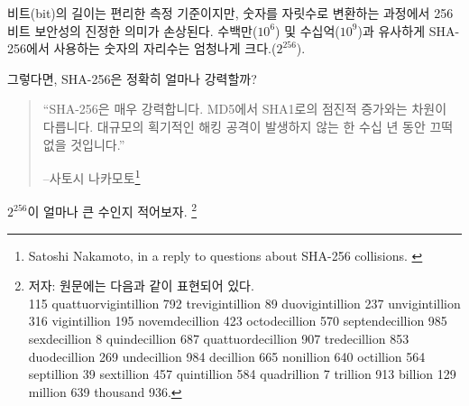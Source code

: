 \begin{comment}
	While bit length is a convenient metric, the true meaning of 256-bit
	security is lost in translation. Similar to the millions ($10^6$) and
	billions ($10^9$) above, the number in SHA-256 is about orders of magnitude
	($2^{256}$).
\end{comment}
비트(bit)의 길이는 편리한 측정 기준이지만, 숫자를 자릿수로 변환하는 과정에서 256비트 보안성의 진정한 의미가 손상된다.
수백만($10^6$) 및 수십억($10^9$)과 유사하게 SHA-256에서 사용하는 숫자의 자리수는 엄청나게 크다.($2^{256}$).
\begin{comment}
	So, how strong is SHA-256, exactly?
\end{comment}
그렇다면, SHA-256은 정확히 얼마나 강력할까?

\begin{comment}
	\begin{quotation}\begin{samepage}
			\enquote{SHA-256 is very strong. It's not like the incremental step from MD5
				to SHA1. It can last several decades unless there's some massive
				breakthrough attack.}
			\begin{flushright} -- Satoshi Nakamoto\footnote{Satoshi Nakamoto, in a reply to questions about SHA-256 collisions. \cite{satoshi-sha256}}
	\end{flushright}\end{samepage}\end{quotation}
\end{comment}
\begin{quotation}\begin{samepage}
		\enquote{SHA-256은 매우 강력합니다. MD5에서 SHA1로의 점진적 증가와는 차원이 다릅니다.
			대규모의 획기적인 해킹 공격이 발생하지 않는 한 수십 년 동안 끄떡없을 것입니다.}
		\begin{flushright} --사토시 나카모토\footnote{Satoshi Nakamoto, in a reply to questions about SHA-256 collisions. \cite{satoshi-sha256}}
\end{flushright}\end{samepage}\end{quotation}


$2^{256}$이 얼마나 큰 수인지 적어보자.
\footnote{
	저자: 원문에는 다음과 같이 표현되어 있다. \\
	115 quattuorvigintillion 792 trevigintillion 89 duovigintillion 237
	unvigintillion 316 vigintillion 195 novemdecillion 423 octodecillion 570
	septendecillion 985 sexdecillion 8 quindecillion 687 quattuordecillion 907
	tredecillion 853 duodecillion 269 undecillion 984 decillion 665 nonillion
	640 octillion 564 septillion 39 sextillion 457 quintillion 584 quadrillion 7
	trillion 913 billion 129 million 639 thousand 936.}

